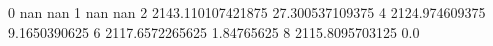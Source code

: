 0 nan nan
1 nan nan
2 2143.110107421875 27.300537109375
4 2124.974609375 9.1650390625
6 2117.6572265625 1.84765625
8 2115.8095703125 0.0

